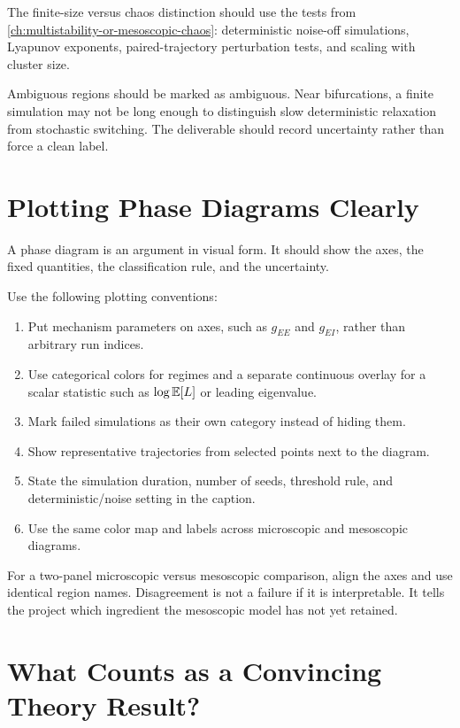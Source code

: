 The finite-size versus chaos distinction should use the tests from \cref{ch:multistability-or-mesoscopic-chaos}: deterministic noise-off simulations, Lyapunov exponents, paired-trajectory perturbation tests, and scaling with cluster size.

Ambiguous regions should be marked as ambiguous. Near bifurcations, a finite simulation may not be long enough to distinguish slow deterministic relaxation from stochastic switching. The deliverable should record uncertainty rather than force a clean label.

\section{Plotting Phase Diagrams Clearly}
\label{sec:plotting-phase-diagrams-clearly}

A phase diagram is an argument in visual form. It should show the axes, the fixed quantities, the classification rule, and the uncertainty.

Use the following plotting conventions:
%
\begin{enumerate}[leftmargin=*]
  \item Put mechanism parameters on axes, such as $g_{EE}$ and $g_{EI}$, rather than arbitrary run indices.
  \item Use categorical colors for regimes and a separate continuous overlay for a scalar statistic such as $\log\mathbb{E}[L]$ or leading eigenvalue.
  \item Mark failed simulations as their own category instead of hiding them.
  \item Show representative trajectories from selected points next to the diagram.
  \item State the simulation duration, number of seeds, threshold rule, and deterministic/noise setting in the caption.
  \item Use the same color map and labels across microscopic and mesoscopic diagrams.
\end{enumerate}

For a two-panel microscopic versus mesoscopic comparison, align the axes and use identical region names. Disagreement is not a failure if it is interpretable. It tells the project which ingredient the mesoscopic model has not yet retained.

\section{What Counts as a Convincing Theory Result?}
\label{sec:convincing-theory-result}


